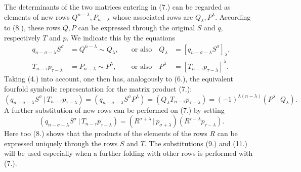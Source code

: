 \documentclass[11pt]{article}
\providecommand{\pair}[2]{(#1\,|\,#2)}
\begin{document}
The determinants of the two matrices entering in (7.) can be regarded as elements of new rows $Q^{n-\lambda},P_{n-\lambda}$ whose associated rows are $Q_\lambda,P^\lambda$. According to (8.), these rows $Q,P$ can be expressed through the original $S$ and $q$, respectively $T$ and $p$. We indicate this by the equations
\begin{equation}
\begin{aligned}
 q_{n-\sigma-\lambda}S^\sigma&=Q^{n-\lambda}\sim Q_\lambda, &\quad\text{or also}\quad Q_\lambda&=[q_{n-\sigma-\lambda}S^\sigma]_\lambda,\\
 T_{n-\tau}p_{\tau-\lambda}&=P_{n-\lambda}\sim P^\lambda, &\quad\text{or also}\quad P^\lambda&=[T_{n-\tau}p_{\tau-\lambda}]^\lambda.
\end{aligned}
\tag{9}
\end{equation}
Taking (4.) into account, one then has, analogously to (6.), the equivalent fourfold symbolic representation for the matrix product (7.):
\begin{equation}
\pair{q_{n-\sigma-\lambda}S^\sigma}{T_{n-\tau}p_{\tau-\lambda}}
=(q_{n-\sigma-\lambda}S^\sigma P^\lambda)=(Q_\lambda T_{n-\tau}p_{\tau-\lambda})=(-1)^{\lambda(n-\lambda)}\pair{P^\lambda}{Q_\lambda}.
\tag{10}
\end{equation}
A further substitution of new rows can be performed on (7.) by setting
\begin{equation}
 \pair{q_{n-\sigma-\lambda}S^\sigma}{T_{n-\tau}p_{\tau-\lambda}}
 =\pair{R^{\sigma+\lambda}}{p_{\sigma+\lambda}}(R^{\tau-\lambda}p_{\tau-\lambda}).
\tag{11}
\end{equation}
Here too (8.) shows that the products of the elements of the rows $R$ can be expressed uniquely through the rows $S$ and $T$. The substitutions (9.) and (11.) will be used especially when a further folding with other rows is performed with (7.).
\end{document}
